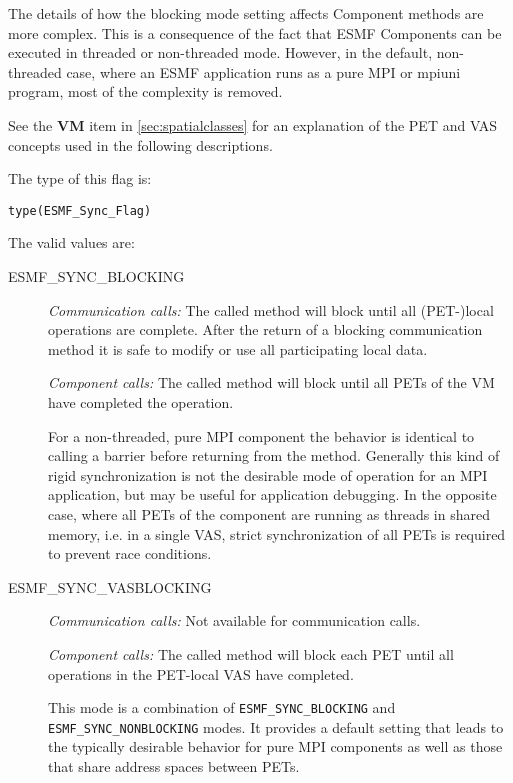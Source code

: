 The details of how the blocking mode setting affects Component methods are
more complex. This is a consequence of the fact that ESMF Components can be
executed in threaded or non-threaded mode. However, in the default,
non-threaded case, where an ESMF application runs as a pure MPI or mpiuni
program, most of the complexity is removed.

See the {\bf VM} item in \ref{sec:spatialclasses} for an
explanation of the PET and VAS concepts used in the following
descriptions.
         
The type of this flag is:

{\tt type(ESMF\_Sync\_Flag)}

The valid values are:
\begin{description}

\item [ESMF\_SYNC\_BLOCKING]
         {\em Communication calls:} The called method will block until all
         (PET-)local operations are complete. After the return of a blocking
         communication method it is safe to modify or use all participating
         local data.
         
         {\em Component calls:} The called method will block until all PETs of
         the VM have completed the operation.
         
         For a non-threaded, pure MPI
         component the behavior is identical to calling a barrier before 
         returning from the method. Generally this kind of rigid 
         synchronization is not the desirable mode of operation for an MPI
         application, but may be useful for application debugging.
         In the opposite case, where all PETs of the component are running as
         threads in shared memory, i.e. in a single VAS, strict synchronization
         of all PETs is required to prevent race conditions.

\item [ESMF\_SYNC\_VASBLOCKING]
         {\em Communication calls:} Not available for communication calls.
         
         {\em Component calls:} The called method will block each PET until
         all operations in the PET-local VAS have completed. 
         
         This mode is a combination of {\tt ESMF\_SYNC\_BLOCKING} and
         {\tt ESMF\_SYNC\_NONBLOCKING} modes. It provides a default setting 
         that leads to the typically desirable behavior for pure MPI 
         components as well as those that share address spaces between PETs.
         

\end{description}

